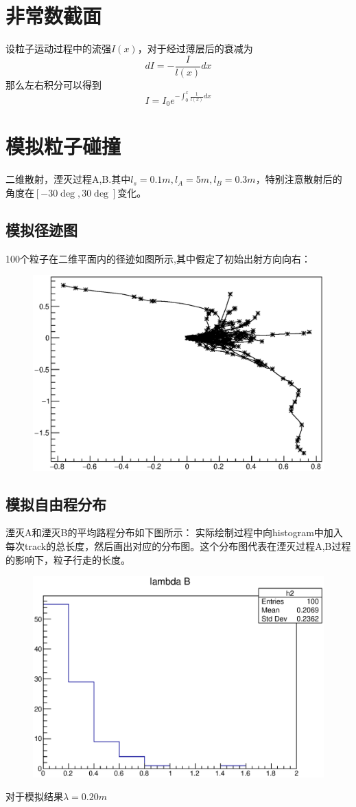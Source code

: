 \documentclass[UTF8]{ctexart}
\begin{document}
\section{非常数截面}
设粒子运动过程中的流强$I(x)$，对于经过薄层后的衰减为
\[dI=-\frac{I}{l(x)}dx\]
那么左右积分可以得到
\[I=I_0e^{-\int_0^x{\frac{1}{l(x)}dx}}\]
\section{模拟粒子碰撞}
二维散射，湮灭过程A,B.其中$l_s=0.1m,l_A=5m,l_B=0.3m$，特别注意散射后的角度在$[-30\deg,30\deg]$变化。
\subsection{模拟径迹图}
100个粒子在二维平面内的径迹如图所示,其中假定了初始出射方向向右：
\begin{figure}[h]
\includegraphics[width=.8\textwidth]{track100.eps}
\end{figure}
\subsection{模拟自由程分布}
湮灭A和湮灭B的平均路程分布如下图所示：
实际绘制过程中向histogram中加入每次track的总长度，然后画出对应的分布图。这个分布图代表在湮灭过程A,B过程的影响下，粒子行走的长度。
\begin{figure}[h]
\includegraphics[width=.8\textwidth]{distribution100.eps}
\end{figure}
对于模拟结果$\lambda=0.20m$
\end{document}

